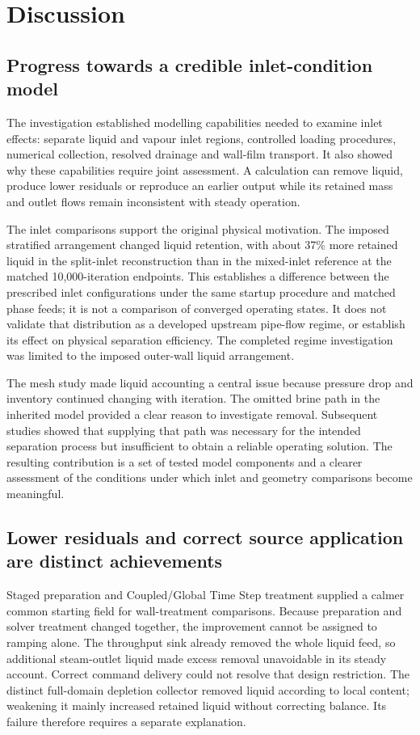 \section{Discussion}

\subsection{Progress towards a credible inlet-condition model}

The investigation established modelling capabilities needed to examine inlet effects: separate liquid and vapour inlet regions, controlled loading procedures, numerical collection, resolved drainage and wall-film transport. It also showed why these capabilities require joint assessment. A calculation can remove liquid, produce lower residuals or reproduce an earlier output while its retained mass and outlet flows remain inconsistent with steady operation.

The inlet comparisons support the original physical motivation. The imposed stratified arrangement changed liquid retention, with about 37\% more retained liquid in the split-inlet reconstruction than in the mixed-inlet reference at the matched 10,000-iteration endpoints. This establishes a difference between the prescribed inlet configurations under the same startup procedure and matched phase feeds; it is not a comparison of converged operating states. It does not validate that distribution as a developed upstream pipe-flow regime, or establish its effect on physical separation efficiency. The completed regime investigation was limited to the imposed outer-wall liquid arrangement.

The mesh study made liquid accounting a central issue because pressure drop and inventory continued changing with iteration. The omitted brine path in the inherited model provided a clear reason to investigate removal. Subsequent studies showed that supplying that path was necessary for the intended separation process but insufficient to obtain a reliable operating solution. The resulting contribution is a set of tested model components and a clearer assessment of the conditions under which inlet and geometry comparisons become meaningful.

\subsection{Lower residuals and correct source application are distinct achievements}

Staged preparation and Coupled/Global Time Step treatment supplied a calmer common starting field for wall-treatment comparisons. Because preparation and solver treatment changed together, the improvement cannot be assigned to ramping alone. The throughput sink already removed the whole liquid feed, so additional steam-outlet liquid made excess removal unavoidable in its steady account. Correct command delivery could not resolve that design restriction. The distinct full-domain depletion collector removed liquid according to local content; weakening it mainly increased retained liquid without correcting balance. Its failure therefore requires a separate explanation.

